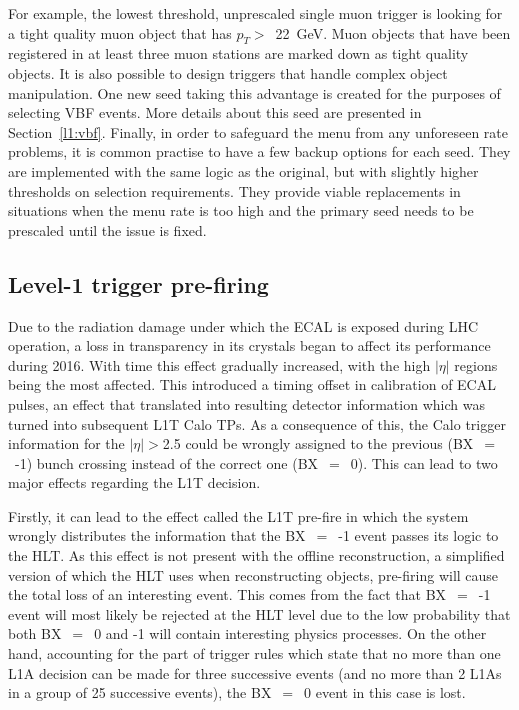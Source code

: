 \hspace{10pt}For example, the lowest threshold, unprescaled single muon trigger is looking for a tight quality muon object that has $p_T>$~22~GeV. Muon objects that have been registered in at least three muon stations are marked down as tight quality objects. It is also possible to design triggers that handle complex object manipulation. One new seed taking this advantage is created for the purposes of selecting VBF events. More details about this seed are presented in Section~\ref{l1:vbf}. Finally, in order to safeguard the menu from any unforeseen rate problems, it is common practise to have a few backup options for each seed. They are implemented with the same logic as the original, but with slightly higher thresholds on selection requirements. They provide viable replacements in situations when the menu rate is too high and the primary seed needs to be prescaled until the issue is fixed. 

\subsection{Level-1 trigger pre-firing}
\label{sec:l1_prefire}
\hspace{10pt} Due to the radiation damage under which the ECAL is exposed during LHC operation, a loss in transparency in its crystals began to affect its performance during 2016. With time this effect gradually increased, with the high $|\eta|$ regions being the most affected. This introduced a timing offset in calibration of ECAL pulses, an effect that translated into resulting detector information which was turned into subsequent L1T Calo TPs. As a consequence of this, the Calo trigger information for the $|\eta|>$2.5 could be wrongly assigned to the previous (BX~$=$~-1) bunch crossing instead of the correct one (BX~$=$~0). This can lead to two major effects regarding the L1T decision.

\hspace{10pt} Firstly, it can lead to the effect called the L1T pre-fire in which the system wrongly distributes the information that the BX~$=$~-1 event passes its logic to the HLT. As this effect is not present with the offline reconstruction, a simplified version of which the HLT uses when reconstructing objects, pre-firing will cause the total loss of an interesting event. This comes from the fact that BX~$=$~-1 event will most likely be rejected at the HLT level due to the low probability that both BX~$=$~0 and -1  will contain interesting physics processes. On the other hand, accounting for the part of trigger rules which state that no more than one L1A decision can be made for three successive events (and no more than 2 L1As in a group of 25 successive events), the BX~$=$~0 event in this case is lost.

